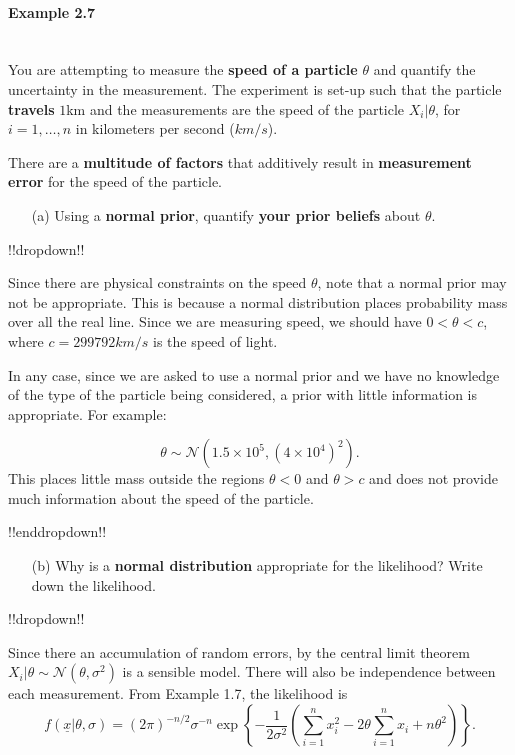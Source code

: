 \paragraph{Example 2.7}{~\\
You are attempting to measure the \textbf{\color{darkblue}speed of a particle} $\theta$ and quantify the uncertainty in the measurement. The experiment is set-up such that the particle \textbf{\color{darkblue}travels} $1$km and the measurements are the speed of the particle $X_i|\theta$, for $i = 1,\ldots, n$ in kilometers per second ($km/s$).

There are a \textbf{\color{darkblue}multitude of factors} that additively result in \textbf{\color{darkblue}measurement error} for the speed of the particle.

\begin{itemize}
\item [(a)] Using a \textbf{\color{darkblue}normal prior}, quantify \textbf{\color{darkblue}your prior beliefs} about $\theta$.
\end{itemize}

!!dropdown!!

Since there are physical constraints on the speed $\theta$, note that a normal prior may not be appropriate. This is because a normal distribution places probability mass over all the real line. Since we are measuring speed, we should have $0 < \theta < c$, where $c = 299792 km/s$ is the speed of light. 

    In any case, since we are asked to use a normal prior and we have no knowledge of the type of the particle being considered, a prior with little information is appropriate. For example:

    $$ \theta \sim \mathcal{N}(1.5\times 10^5, (4\times 10^4)^2).$$ 
    This places little mass outside the regions $\theta < 0$ and $\theta > c$ and does not provide much information about the speed of the particle.

!!enddropdown!!

\begin{itemize}
\item [(b)] Why is a \textbf{\color{darkblue}normal distribution} appropriate for the likelihood? Write down the likelihood.
\end{itemize}
!!dropdown!!

Since there an accumulation of random errors, by the central limit theorem $X_i|\theta\sim\mathcal{N}(\theta, \sigma^2)$ is a sensible model. There will also be independence between each measurement. From Example 1.7, the likelihood is
    $$ f(\underline{x}|\theta,\sigma) =  (2\pi)^{-n/2}\sigma^{-n}
        \exp\left\{-\frac{1}{2\sigma^2}
        \left(\sum_{i=1}^n x_i^2-2\theta\sum_{i=1}^n x_i+n\theta^2\right)\right\}.$$

}

